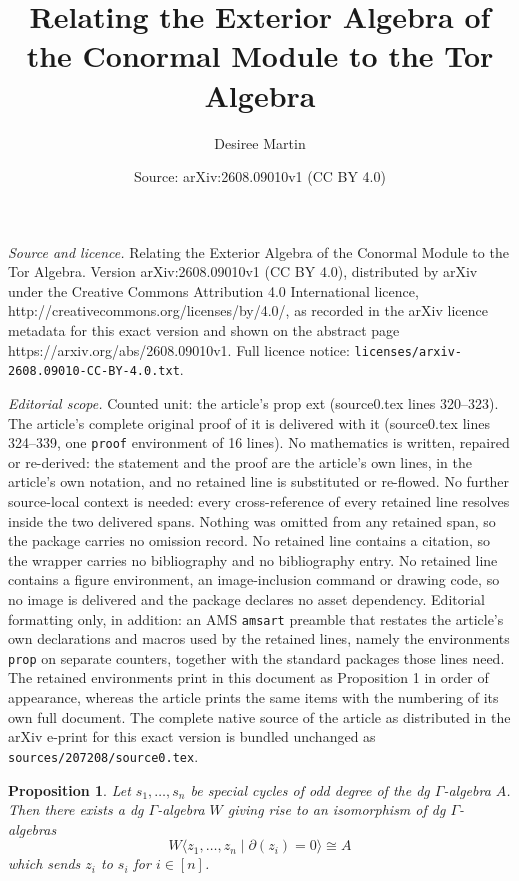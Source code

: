 \documentclass[10pt,a4paper]{amsart}
\title{Relating the Exterior Algebra of the Conormal Module to the Tor Algebra}
\author{Desiree Martin}
\date{Source: arXiv:2608.09010v1 (CC BY 4.0)}
\newtheorem{prop}{Proposition}
\begin{document}
\maketitle

\noindent\emph{Source and licence.} Relating the Exterior Algebra of the Conormal Module to the Tor Algebra. Version arXiv:2608.09010v1 (CC BY 4.0), distributed by arXiv under the Creative Commons Attribution 4.0 International licence, http://creativecommons.org/licenses/by/4.0/, as recorded in the arXiv licence metadata for this exact version and shown on the abstract page https://arxiv.org/abs/2608.09010v1. Full licence notice: \texttt{licenses/arxiv-2608.09010-CC-BY-4.0.txt}.\par\smallskip

\noindent\textit{Editorial scope.} Counted unit: the article's prop ext (source0.tex lines 320--323). The article's complete original proof of it is delivered with it (source0.tex lines 324--339, one \texttt{proof} environment of 16 lines). No mathematics is written, repaired or re-derived: the statement and the proof are the article's own lines, in the article's own notation, and no retained line is substituted or re-flowed.  No further source-local context is needed: every cross-reference of every retained line resolves inside the two delivered spans.  Nothing was omitted from any retained span, so the package carries no omission record.  No retained line contains a citation, so the wrapper carries no bibliography and no bibliography entry.  No retained line contains a figure environment, an image-inclusion command or drawing code, so no image is delivered and the package declares no asset dependency.  Editorial formatting only, in addition: an AMS \texttt{amsart} preamble that restates the article's own declarations and macros used by the retained lines, namely the environments \texttt{prop} on separate counters, together with the standard packages those lines need.  The retained environments print in this document as Proposition 1 in order of appearance, whereas the article prints the same items with the numbering of its own full document.  The complete native source of the article as distributed in the arXiv e-print for this exact version is bundled unchanged as \texttt{sources/207208/source0.tex}.
\begin{prop}
\label{prop6 ext}
    Let $s_1,\ldots, s_n$ be special cycles of odd degree of the dg $\Gamma$-algebra $A$. Then there exists a dg $\Gamma$-algebra $W$ giving rise to an isomorphism of dg $\Gamma$-algebras $$W\langle z_1, \ldots, z_n \mid \partial(z_i)=0 \rangle \cong A$$ which sends $z_i$ to $s_i$ for  $i \in [n]$.
\end{prop}
\end{document}

